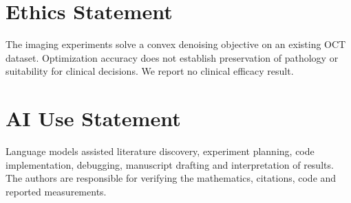 \documentclass{article}
\theoremstyle{definition}
\theoremstyle{remark}
\begin{document}
\section*{Ethics Statement}
The imaging experiments solve a convex denoising objective on an existing OCT
dataset. Optimization accuracy does not establish preservation of pathology or
suitability for clinical decisions. We report no clinical efficacy result.

\section*{AI Use Statement}
Language models assisted literature discovery, experiment planning, code
implementation, debugging, manuscript drafting and interpretation of results.
The authors are responsible for verifying the mathematics, citations, code and
reported measurements.




\appendix



\end{document}

